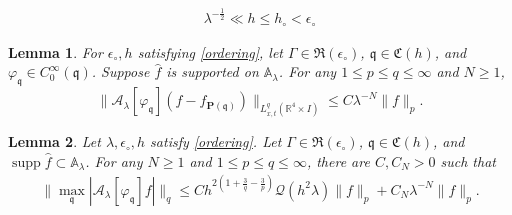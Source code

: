 \documentclass[10pt,a4paper]{amsart}
\newtheorem{lem}{Lemma}
\newcommand{\R}{\mathbb R}
\newcommand{\fq}{\mathfrak q}
\DeclareMathOperator{\supp}{supp}
\begin{document}
\begin{align}\label{ordering}
\lambda^{-\frac12}  \ll h \le h_\circ <\epsilon_\circ
\end{align}

\begin{lem}\label{lem:away_crit}
For $\epsilon_\circ, h $ satisfying \eqref{ordering}, 
let $\Gamma \in \mathfrak R (\epsilon_\circ)$, $\fq \in \mathfrak C(h)$,
and $\varphi_{\fq} \in C_0^\infty(\fq)$. 
Suppose  $\widehat f$ is supported on $ \mathbb A_\lambda$.
For any $1\le p \le q \le \infty$ and $N\ge1$,
\begin{equation}\label{est:away_crit}
\big\| \mathcal A_\lambda [\varphi_{\fq}](f-f_{\mathbf P(\fq)})\big\|_{L_{x,t}^q(\R^4 \times I)} \le C\lambda^{-N}\|f\|_p .
\end{equation}
\end{lem}

\begin{lem} 
Let $\lambda,\epsilon_\circ, h$ satisfy \eqref{ordering}. Let $\Gamma 
\in\mathfrak R (\epsilon_\circ)$, $\fq \in  \mathfrak C(h)$, and  $\supp \widehat f  \subset   \mathbb A_\lambda$.
For any $N\ge1$ and $1\le p \le q \le \infty$, there are $C, C_N>0$ such that
\begin{align}\label{linear 1}
\big\|\max_{\fq}|\mathcal A_\lambda [\varphi_{\fq}]f|\big\|_{q}
\le C h^{2(1+\frac3q-\frac3p)}
\mathscr Q ( h^2 \lambda) 
\|f\|_p  +C_N\lambda^{-N}\|f\|_p .
\end{align}
\end{lem}
\end{document}
